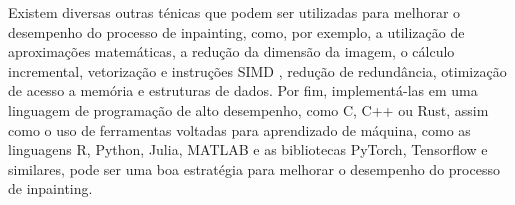 Existem diversas outras ténicas que podem ser utilizadas para melhorar o desempenho do processo de inpainting, como, por exemplo, a utilização de aproximações matemáticas, a redução da dimensão da imagem, o cálculo incremental, vetorização e instruções SIMD \cite{intel2022manual}, redução de redundância, otimização de acesso a memória e estruturas de dados. Por fim, implementá-las em uma linguagem de programação de alto desempenho, como C, C++ ou Rust, assim como o uso de ferramentas voltadas para aprendizado de máquina, como as linguagens R, Python, Julia, MATLAB e as bibliotecas PyTorch, Tensorflow \cite{tensorflow2015-whitepaper} e similares, pode ser uma boa estratégia para melhorar o desempenho do processo de inpainting.

